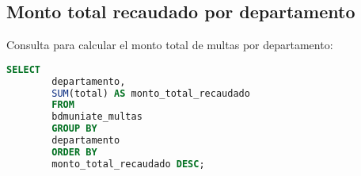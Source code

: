 \documentclass[12pt]{article}
\begin{document}
	\subsection{Monto total recaudado por departamento}
	Consulta para calcular el monto total de multas por departamento:
	\begin{lstlisting}[language=SQL]
		SELECT 
		departamento,
		SUM(total) AS monto_total_recaudado
		FROM 
		bdmuniate_multas
		GROUP BY 
		departamento
		ORDER BY 
		monto_total_recaudado DESC;
	\end{lstlisting}
	
\end{document}
